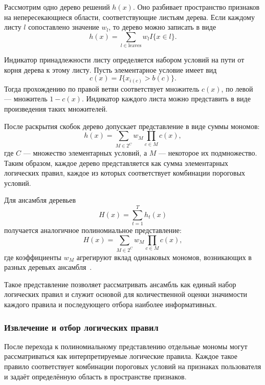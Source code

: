 Рассмотрим одно дерево решений \(h(x)\). Оно разбивает пространство
признаков на непересекающиеся области, соответствующие листьям дерева.
Если каждому листу \(l\) сопоставлено значение \(w_l\), то дерево можно
записать в виде
\begin{equation}
    h(x) = \sum_{l \in \mathrm{leaves}} w_l I\{x \in l\}.
\end{equation}

Индикатор принадлежности листу определяется набором условий на пути
от корня дерева к этому листу. Пусть элементарное условие имеет вид
\[
c(x) = I\{x_{i(c)} > b(c)\}.
\]
Тогда прохождению по правой ветви соответствует множитель \(c(x)\),
по левой — множитель \(1 - c(x)\). Индикатор каждого листа можно
представить в виде произведения таких множителей.

После раскрытия скобок дерево допускает представление в виде суммы
мономов:
\begin{equation}
    h(x) = \sum_{M \in 2^C} w_M \prod_{c \in M} c(x),
\end{equation}
где \(C\) — множество элементарных условий, а \(M\) — некоторое их
подмножество. Таким образом, каждое дерево представляется как сумма
элементарных логических правил, каждое из которых соответствует
комбинации пороговых условий.

Для ансамбля деревьев
\[
H(x) = \sum_{t=1}^{T} h_t(x)
\]
получается аналогичное полиномиальное представление:
\begin{equation}
    H(x) = \sum_{M \in 2^C} w_M \prod_{c \in M} c(x),
\end{equation}
где коэффициенты \(w_M\) агрегируют вклад одинаковых мономов,
возникающих в разных деревьях ансамбля~\cite{monoforest}.

Такое представление позволяет рассматривать ансамбль как единый
набор логических правил и служит основой для количественной оценки
значимости каждого правила и последующего отбора наиболее информативных.

\subsubsection{Извлечение и отбор логических правил}
\label{subsubsec:rule_extraction}

После перехода к полиномиальному представлению отдельные мономы могут
рассматриваться как интерпретируемые логические правила. Каждое такое
правило соответствует комбинации пороговых условий на признаках
пользователя и задаёт определённую область в пространстве признаков.

